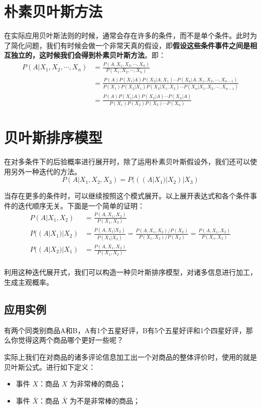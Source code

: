 \documentclass[12pt]{article}
\begin{document}
\section{朴素贝叶斯方法}
在实际应用贝叶斯法则的时候，通常会存在许多的条件，而不是单个条件。此时为了简化问题，我们有时候会做一个非常天真的假设，即\textbf{假设这些条件事件之间是相互独立的，这时候我们会得到朴素贝叶斯方法}。即：
\begin{align*}
P(A|X_1,X_2,\cdots,X_n) &= \frac{P(A,X_1,X_2,\cdots,X_n) }{P(X_1,X_2,\cdots,X_n)} \\
	&= \frac{P(A)P(X_1|A)P(X_2|A,X_1)\cdots P(X_n|A,X_1, X_2, \cdots, X_{n-1})}{P(X_1)P(X_2|X_1)P(X_3|X_1,X_2)\cdots P(X_n|X_1, X_2, \cdots, X_{n-1})} \\
	&= \frac{P(A)P(X_1|A)P(X_2|A)\cdots P(X_n|A)}{P(X_1)P(X_2)P(X_3)\cdots P(X_n)}
\end{align*}

\section{贝叶斯排序模型}
在对多条件下的后验概率进行展开时，除了运用朴素贝叶斯假设外，我们还可以使用另外一种迭代的方法。
$$
P(A|X_1,X_2,X_3) = P(((A|X_1)|X_2)|X_3)
$$

当存在更多的条件时，可以继续按照这个模式展开。以上展开表达式和各个条件事件的迭代顺序无关。下面是一个简单的证明：
\begin{align*}
P(A | X_1, X_2) &= \frac{P(A, X_1, X_2)}{P(X_1, X_2)} \\
P((A | X_1) | X_2) &= \frac{P(A, X_1| X_2)}{P(X_1|X_2)} = \frac{P(A, X_1, X_2)/P(X_2)}{P(X_1, X_2)/P(X_2)} = \frac{P(A, X_1, X_2)}{P(X_1, X_2)} \\
P((A | X_2) | X_1) &= \frac{P(A, X_1, X_2)}{P(X_1, X_2)} \\
\end{align*}

利用这种迭代展开式，我们可以构造一种贝叶斯排序模型，对诸多信息进行加工，生成主观概率。

\subsection{应用实例}
有两个同类别商品A和B，A有1个五星好评，B有5个五星好评和1个四星好评，那么你觉得这两个商品哪个更好一些呢？

实际上我们在对商品的诸多评论信息加工出一个对商品的整体评价时，使用的就是贝叶斯公式。进行如下定义：
\begin{itemize}
\setlength{\itemsep}{0pt}
\setlength{\parsep}{0pt}
\setlength{\parskip}{0pt}
    \item 事件 $X$：商品 $X$ 为非常棒的商品；
    \item 事件 $\bar{X}$：商品 $\bar{X}$ 为不是非常棒的商品；
\end{itemize}
\end{document}

